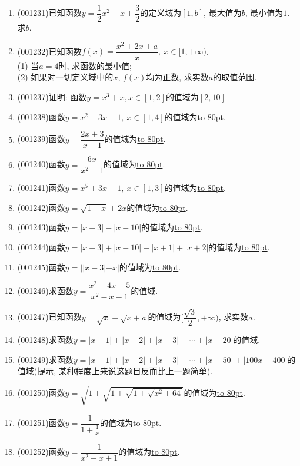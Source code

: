 \documentclass[10pt,a4paper]{article}
\newcommand{\blank}[1]{\underline{\hbox to #1pt{}}}
\begin{document}
\begin{enumerate}[1.]
\blank{25}(5) $y=3f(2x-1)+6$的图像关于点$(\dfrac{1}{2},2)$对称;\\ 
\blank{25}(6) $y=f(x^2)$是偶函数;\\ 
\blank{25}(7) $y=f^{-1}(x)$一定存在;\\ 
\blank{25}(8) $y=f^{-1}(x)$如果存在, 则必定是奇函数.
\item {\tiny (001231)}已知函数$y=\dfrac{1}{2}x^2-x+\dfrac{3}{2}$的定义域为$[1,b]$, 最大值为$b$, 最小值为$1$. 求$b$.
\item {\tiny (001232)}已知函数$f(x)=\dfrac{x^2+2x+a}{x}, \ x \in [1,+\infty)$.\\ 
(1) 当$a=4$时, 求函数的最小值;\\ 
(2) 如果对一切定义域中的$x$, $f(x)$均为正数, 求实数$a$的取值范围.
\item {\tiny (001237)}证明: 函数$y=x^3+x,x\in [1,2]$的值域为$[2,10]$
\item {\tiny (001238)}函数$y=x^2-3x+1, \ x \in [1,4]$的值域为\blank{80}.
\item {\tiny (001239)}函数$y=\dfrac{2x+3}{x-1}$的值域为\blank{80}.
\item {\tiny (001240)}函数$y=\dfrac{6x}{x^2+1}$的值域为\blank{80}.
\item {\tiny (001241)}函数$y=x^5+3x+1, \ x \in [1,3]$的值域为\blank{80}.
\item {\tiny (001242)}函数$y=\sqrt{1+x}+2x$的值域为\blank{80}.
\item {\tiny (001243)}函数$y=|x-3|-|x-10|$的值域为\blank{80}.
\item {\tiny (001244)}函数$y=|x-3|+|x-10|+|x+1|+|x+2|$的值域为\blank{80}.
\item {\tiny (001245)}函数$y=||x-3|+x|$的值域为\blank{80}.
\item {\tiny (001246)}求函数$y=\dfrac{x^2-4x+5}{x^2-x-1}$的值域.
\item {\tiny (001247)}已知函数$y=\sqrt{x}+\sqrt{x+a}$的值域为$[\dfrac{\sqrt{3}}{2},+\infty)$, 求实数$a$.
\item {\tiny (001248)}求函数$y=|x-1|+|x-2|+|x-3|+\cdots+|x-20|$的值域.
\item {\tiny (001249)}求函数$y=|x-1|+|x-2|+|x-3|+\cdots+|x-50|+|100x-400|$的值域(提示, 某种程度上来说这题目反而比上一题简单).
\item {\tiny (001250)}函数$y=\sqrt{1+\sqrt{1+\sqrt{1+\sqrt{x^2+64}}}}$的值域为\blank{80}.
\item {\tiny (001251)}函数$y=\dfrac{1}{1+\frac{1}{x}}$的值域为\blank{80}.
\item {\tiny (001252)}函数$y=\dfrac{1}{x^2+x+1}$的值域为\blank{80}.

\end{enumerate}
\end{document}
